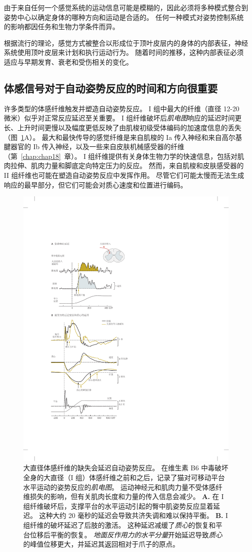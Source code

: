 由于来自任何一个感觉系统的运动信息可能是模糊的，因此必须将多种模式整合到姿势中心以确定身体的哪种方向和运动是合适的。
任何一种模式对姿势控制系统的影响都因任务和生物力学条件而异。


根据流行的理论，感觉方式被整合以形成位于顶叶皮层内的身体的内部表征，神经系统使用顶叶皮层来计划和执行运动行为。
随着时间的推移，这种内部表征必须适应与早期发育、衰老和受伤相关的变化。



\subsection{体感信号对于自动姿势反应的时间和方向很重要}

许多类型的体感纤维触发并塑造自动姿势反应。
I 组中最大的纤维（直径 12-20 微米）似乎对正常反应延迟至关重要。
I 组纤维破坏后\textit{肌电图}响应的延迟时间更长、上升时间更慢以及幅度更低反映了由肌梭初级受体编码的加速度信息的丢失（图~\ref{fig:36_9}A）。
最大和最快传导的感觉纤维是来自肌梭的 Ia 传入神经和来自高尔基腱器官的 Ib 传入神经，以及一些来自皮肤机械感受器的纤维（第~\ref{chap:chap18}~章）。
I 组纤维提供有关身体生物力学的快速信息，包括对肌肉拉伸、肌肉力量和脚底定向特定压力的反应。
然而，来自肌梭和皮肤感受器的 II 组纤维也可能在塑造自动姿势反应中发挥作用。
尽管它们可能太慢而无法生成响应的最早部分，但它们可能会对质心速度和位置进行编码。


\begin{figure}[htbp]
	\centering
	\includegraphics[width=0.65\linewidth]{chap36/fig_36_9}
	\caption{大直径体感纤维的缺失会延迟自动姿势反应。
		在维生素 B6 中毒破坏全身的大直径（I 组）体感纤维之前和之后，记录了猫对可移动平台水平运动的姿势反应的\textit{肌电图}。
		运动神经元和肌肉力量不受体感纤维损失的影响，但有关肌肉长度和力量的传入信息会减少。
		\textbf{A.} 在 I 组纤维破坏后，支撑平台的水平运动引起的臀中肌姿势反应显着延迟。
		这种大约 20 毫秒的延迟会导致共济失调和难以保持平衡。
		\textbf{B.} I 组纤维的破坏延迟了后肢的激活。
		这种延迟减缓了\textit{质心}的恢复和平台位移后平衡的恢复。
		\textit{地面反作用力的水平分量}开始延迟导致\textit{质心}的峰值位移更大，并延迟其返回相对于爪子的原点。}
	\label{fig:36_9}
\end{figure}


